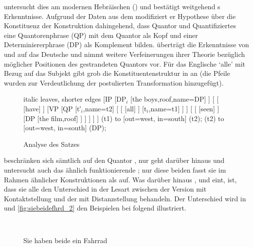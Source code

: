 \citet{shlonsky1991} untersucht dies am modernen Hebräischen () und
bestätigt weitgehend \citeauthor{sportiche1988}s Erkenntnisse. Aufgrund der
Daten aus dem  modifiziert er  Hypothese
über die Konstituenz der Konstruktion dahingehend, dass Quantor und
Quantifiziertes eine Quantorenphrase (QP) mit dem Quantor als Kopf und einer
Determiniererphrase (DP) als Komplement bilden. \citet{merchant1996} überträgt
die Erkenntnisse von \citet{sportiche1988} und \citet{shlonsky1991} auf das
Deutsche und nimmt weitere Verfeinerungen ihrer Theorie bezüglich möglicher
Positionen des gestrandeten Quantors vor. Für das Englische  `alle' mit
Bezug auf das Subjekt gibt \citet{merchant1996} grob die Konstituentenstruktur
in  an (die Pfeile wurden zur Verdeutlichung der postulierten
Transformation hinzugefügt).

\begin{figure}
	\begin{forest} italic leaves, shorter edges
	[IP
		[DP$_i$
			[{the boys},roof,name=DP]
		]
		[
			[
				[have]
			]
			[VP
				[QP
					[t′$_i$,name=t2]
					[
						[
							[all]
						]
						[t$_i$,name=t1]
					]
				]
				[
					[
						[seen]
					]
					[DP
						[{the film},roof]
					]
				]
			]
		]
	]
	 (t1) to [out=west, in=south] (t2);
	 (t2) to [out=west, in=south] (DP);
	\end{forest}
	\caption{Analyse des Satzes 
	\autocite[nach][180]{merchant1996}}
	\label{fig:qfgg}
\end{figure}

\textcites{sportiche1988,shlonsky1991,merchant1996} beschränken sich sämtlich
auf den Quantor , nur \citet{pittner1995} geht darüber hinaus und
untersucht auch das ähnlich funktionierende ; nur diese beiden fasst
sie im Rahmen ähnlicher Konstruktionen als  auf. Was
darüber hinaus \citeauthor{shlonsky1991}, \citeauthor{pittner1995} und
\citeauthor{merchant1996} eint, ist, dass sie alle den Unterschied in der
Lesart zwischen der Version mit Kontaktstellung und der mit Distanzstellung
behandeln. Der Unterschied wird in
 und \ref{fig:siebeidefhrd_2} den Beispielen bei
\citet[30--31]{pittner1995} folgend illustriert.

\begin{figure}
\\
\caption{Sie haben beide ein Fahrrad}
\label{fig:siebeidefhrd_1}
\end{figure}

